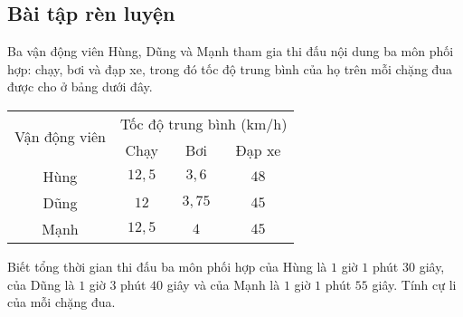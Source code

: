 \subsection{Bài tập rèn luyện}
\begin{bt}%
Ba vận động viên Hùng, Dũng và Mạnh tham gia thi đấu nội dung ba môn phối hợp: chạy, bơi và đạp xe, trong đó tốc độ trung bình của họ trên mỗi chặng đua được cho ở bảng dưới đây.\begin{center}
\begin{tabular}{|c|c|c|c|}
	\hline \multirow{2}{*}{ Vận động viên } & \multicolumn{3}{|c|}{ Tốc độ trung bình (km/h) } \\
	\cline { 2 - 4 } & Chạy & Bơi & Đạp xe \\
	\hline Hùng & $12{,}5$ & $3{,}6$ & $48$ \\
	\hline Dũng & $12$ & $3{,}75$ & $45$ \\
	\hline Mạnh & $12{,}5$ & $4$ & $45$ \\
	\hline
\end{tabular}
\end{center}
Biết tổng thời gian thi đấu ba môn phối hợp của Hùng là $1$ giờ $1$ phút $30$ giây, của Dũng là $1$ giờ $3$ phút $40$ giây và của Mạnh là $1$ giờ $1$ phút $55$ giây. Tính cự li của mỗi chặng đua.
\end{bt}
